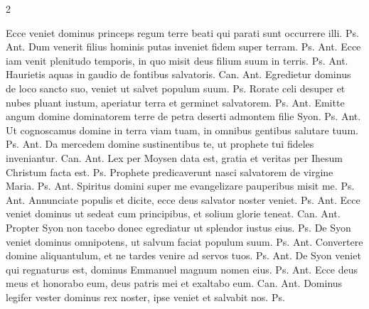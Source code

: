 \begin{multicols*}{2}
\par {} Ecce veniet dominus princeps regum terre beati qui parati sunt occurrere illi. {\color{Red} Ps.}  {\color{Red} Ant.} Dum venerit filius hominis putas inveniet fidem super terram. {\color{Red} Ps.}  {\color{Red} Ant.} Ecce iam venit plenitudo temporis, in quo misit deus filium suum in terris. {\color{Red} Ps.}  {\color{Red} Ant.} Haurietis aquas in gaudio de fontibus salvatoris. {\color{Red} Can.}  {\color{Red} Ant.} Egredietur dominus de loco sancto suo, veniet ut salvet populum suum. {\color{Red} Ps.} 
 Rorate celi desuper et nubes pluant iustum, aperiatur terra et germinet salvatorem. {\color{Red} Ps.}  {\color{Red} Ant.} Emitte angum domine dominatorem terre de petra deserti admontem filie Syon. {\color{Red} Ps.}  {\color{Red} Ant.} Ut cognoscamus domine in terra viam tuam, in omnibus gentibus salutare tuum. {\color{Red} Ps.}  {\color{Red} Ant.} Da mercedem domine sustinentibus te, ut prophete tui fideles inveniantur. {\color{Red} Can.}  {\color{Red} Ant.} Lex per Moysen data est, gratia et veritas per Ihesum Christum facta est. {\color{Red} Ps.} 
 Prophete predicaverunt nasci salvatorem de virgine Maria. {\color{Red} Ps.}  {\color{Red} Ant.} Spiritus domini super me evangelizare pauperibus misit me. {\color{Red} Ps.}  {\color{Red} Ant.} Annunciate populis et dicite, ecce deus salvator noster veniet. {\color{Red} Ps.}  {\color{Red} Ant.} Ecce veniet dominus ut sedeat cum principibus, et solium glorie teneat. {\color{Red} Can.}  {\color{Red} Ant.} Propter Syon non tacebo donec egrediatur ut splendor iustus eius. {\color{Red} Ps.} 
 De Syon veniet dominus omnipotens, ut salvum faciat populum suum. {\color{Red} Ps.}  {\color{Red} Ant.} Convertere domine aliquantulum, et ne tardes venire ad servos tuos. {\color{Red} Ps.}  {\color{Red} Ant.} De Syon veniet qui regnaturus est, dominus Emmanuel magnum nomen eius. {\color{Red} Ps.}  {\color{Red} Ant.} Ecce deus meus et honorabo eum, deus patris mei et exaltabo eum. {\color{Red} Can.}  {\color{Red} Ant.} Dominus legifer vester dominus rex noster, ipse veniet et salvabit nos. {\color{Red} Ps.} 

\end{multicols*}
